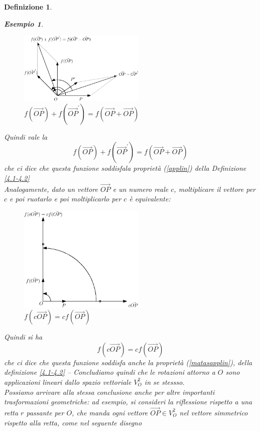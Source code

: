 \message{ !name(algebraegeometria.tex)}\documentclass{book}
\newtheorem{definizione}{Definizione}
\newtheorem{esempio}{Esempio}
\begin{document}
\begin{definizione}
\begin{esempio}
    \clearpage
    \begin{figure}[th]
      \centering
        \includegraphics[width=6cm]{img/finiti/imgex4-2-2.eps}
      \caption{$f(\vec{OP})+f(\vec{OP}^\prime)=f(\vec{OP}+\vec{OP})$}
    \end{figure}
    Quindi vale la
    \begin{equation}
      f(\vec{OP})+f(\vec{OP}^\prime)=f(\vec{OP}+\vec{OP})
    \end{equation}
    che ci dice che questa funzione soddisfala proprietà (\ref{applin}) della Definizione \ref{4.1-4.2}\\
    Analogamente, dato un vettore $\vec{OP}$ e un numero reale $c$, moltiplicare il vettore per $c$ e poi
    ruotarlo e poi moltiplicarlo per $c$ è equivalente:
    \begin{figure}[th]
      \centering
        \includegraphics[width=6cm]{img/finiti/imgex4-2-3.eps}
      \caption{$f(c\vec{OP})=cf(\vec{OP})$}
    \end{figure}
    Quindi si ha
    \begin{equation}
      f(c\vec{OP})=cf(\vec{OP})
    \end{equation}
    che ci dice che questa funzione soddisfa anche la proprietà (\ref{matasapplin}), della definizione
    \ref{4.1-4.2} -- Concludiamo quindi che le rotazioni attorno a $O$ sono applicazioni lineari dallo
    spazio vettoriale $V_O^2$ in se stessso.\\
    Possiamo arrivare alla stessa conclusione anche per altre importanti trasformazioni geometriche: ad
    esempio, si consideri la riflessione rispetto a una retta $r$ passante per $O$, che manda ogni vettore
    $\vec{OP}\in V_O^2$ nel vettore simmetrico rispetto alla retta, come nel seguente disegno

\end{esempio}
\end{definizione}
\end{document}
